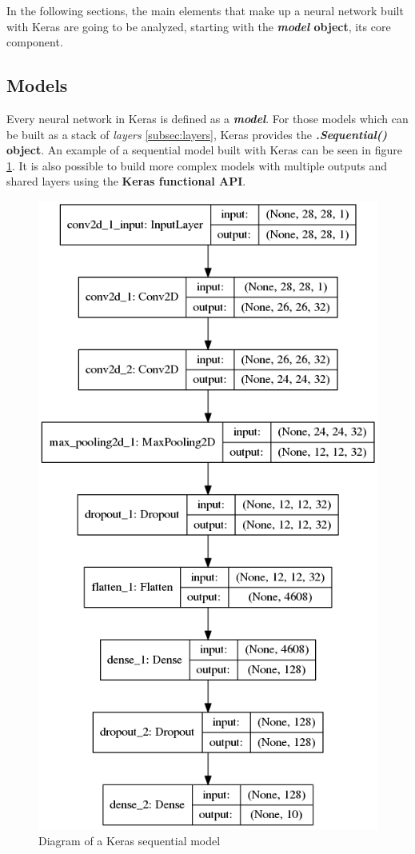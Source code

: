 In the following sections, the main elements that make up a neural network built with Keras are going to be analyzed, starting with the \textbf{\textit{model} object}, its core component.

\subsection{Models}\label{subsec:models}
Every neural network in Keras is defined as a \textbf{\textit{model}}. For those models which can be built as a stack of \textit{layers} \ref{subsec:layers}, Keras provides the \textbf{\textit{.Sequential()} object}. An example of a sequential model built with Keras can be seen in figure \ref{fig:model}. It is also possible to build more complex models with multiple outputs and shared layers using the \textbf{Keras functional API}.
\begin{figure}
	\centering
	\includegraphics[width=0.75\linewidth, keepaspectratio]{figures/model.png}
	\caption{Diagram of a Keras sequential model}
	\label{fig:model}
\end{figure}

